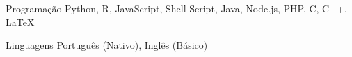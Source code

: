 

\begin{cvskills}





  \cvskill
    {Programação} %
    {Python, R, JavaScript, Shell Script, Java, Node.js, PHP, C, C++, LaTeX} %

  \cvskill
    {Linguagens} %
    {Português (Nativo), Inglês (Básico)} %

\end{cvskills}
